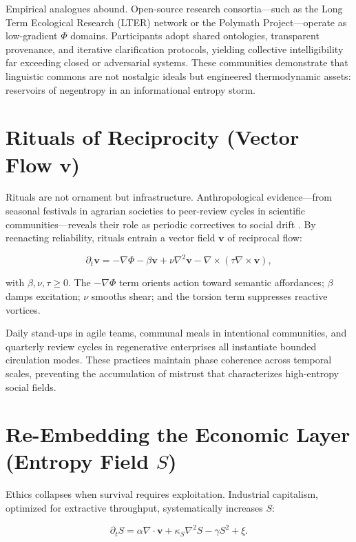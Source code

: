 \documentclass[12pt,a4paper]{article}
\begin{document}
Empirical analogues abound. Open-source research consortia—such as the Long Term Ecological Research (LTER) network or the Polymath Project—operate as low-gradient $\Phi$ domains. Participants adopt shared ontologies, transparent provenance, and iterative clarification protocols, yielding collective intelligibility far exceeding closed or adversarial systems. These communities demonstrate that linguistic commons are not nostalgic ideals but engineered thermodynamic assets: reservoirs of negentropy in an informational entropy storm.

\section{Rituals of Reciprocity \quad (Vector Flow $\bm{v}$)}

Rituals are not ornament but infrastructure. Anthropological evidence—from seasonal festivals in agrarian societies to peer-review cycles in scientific communities—reveals their role as periodic correctives to social drift \cite{bateson1972steps}. By reenacting reliability, rituals entrain a vector field $\bm{v}$ of reciprocal flow:

\begin{equation}
\partial_t \bm{v} = -\nabla \Phi - \beta \bm{v} + \nu \nabla^2 \bm{v} - \nabla \times (\tau \nabla \times \bm{v}),
\end{equation}

with $\beta, \nu, \tau \ge 0$. The $-\nabla \Phi$ term orients action toward semantic affordances; $\beta$ damps excitation; $\nu$ smooths shear; and the torsion term suppresses reactive vortices.

Daily stand-ups in agile teams, communal meals in intentional communities, and quarterly review cycles in regenerative enterprises all instantiate bounded circulation modes. These practices maintain phase coherence across temporal scales, preventing the accumulation of mistrust that characterizes high-entropy social fields.

\section{Re-Embedding the Economic Layer \quad (Entropy Field $S$)}

Ethics collapses when survival requires exploitation. Industrial capitalism, optimized for extractive throughput, systematically increases $S$:

\begin{equation}
\partial_t S = \alpha \nabla\!\cdot\!\bm{v} + \kappa_S \nabla^2 S - \gamma S^2 + \xi.
\end{equation}
\end{document}
